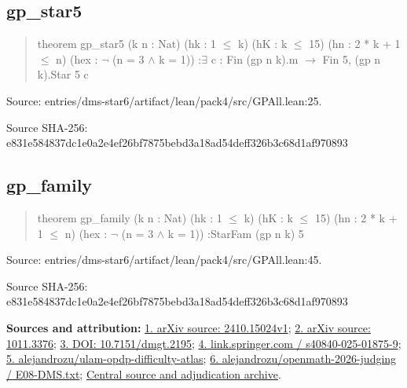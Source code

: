\documentclass[11pt,a4paper]{article}
\begin{document}
\begin{samepage}
\subsection{gp\_star5}
\begin{quote}\small\ttfamily theorem gp\_star5 (k n : Nat) (hk : 1 \ensuremath{\leq} k) (hK : k \ensuremath{\leq} 15) (hn : 2 * k + 1 \ensuremath{\leq} n) (hex : \ensuremath{\neg} (n = 3 \ensuremath{\wedge} k = 1)) :\newline     \ensuremath{\exists} c : Fin (gp n k).m \ensuremath{\to} Fin 5, (gp n k).Star 5 c\end{quote}
{\small Source: entries/dms-star6/artifact/lean/pack4/src/GPAll.lean:25.\par}

{\small Source SHA-256: e831e584837dc1e0a2e4ef26bf7875bebd3a18ad54deff326b3c68d1af970893\par}

\end{samepage}
\begin{samepage}
\subsection{gp\_family}
\begin{quote}\small\ttfamily theorem gp\_family (k n : Nat) (hk : 1 \ensuremath{\leq} k) (hK : k \ensuremath{\leq} 15) (hn : 2 * k + 1 \ensuremath{\leq} n) (hex : \ensuremath{\neg} (n = 3 \ensuremath{\wedge} k = 1)) :\newline     StarFam (gp n k) 5\end{quote}
{\small Source: entries/dms-star6/artifact/lean/pack4/src/GPAll.lean:45.\par}

{\small Source SHA-256: e831e584837dc1e0a2e4ef26bf7875bebd3a18ad54deff326b3c68d1af970893\par}

{\small\textbf{Sources and attribution:} \href{https://arxiv.org/html/2410.15024v1}{1. arXiv source: 2410.15024v1}; \href{https://arxiv.org/abs/1011.3376}{2. arXiv source: 1011.3376}; \href{https://doi.org/10.7151/dmgt.2195}{3. DOI: 10.7151/dmgt.2195}; \href{https://link.springer.com/article/10.1007/s40840-025-01875-9}{4. link.springer.com / s40840-025-01875-9}; \href{https://github.com/alejandrozu/ulam-opdp-difficulty-atlas}{5. alejandrozu/ulam-opdp-difficulty-atlas}; \href{https://github.com/alejandrozu/openmath-2026-judging/blob/d0ed487f487fa7ec814ff705ab55249983fe8707/OpenMath-Judging/review/entries/E08-DMS.txt}{6. alejandrozu/openmath-2026-judging / E08-DMS.txt}; \href{https://github.com/alejandrozu/openmath-2026-judging}{Central source and adjudication archive}.\par}

\end{samepage}
\clearpage
\end{document}
